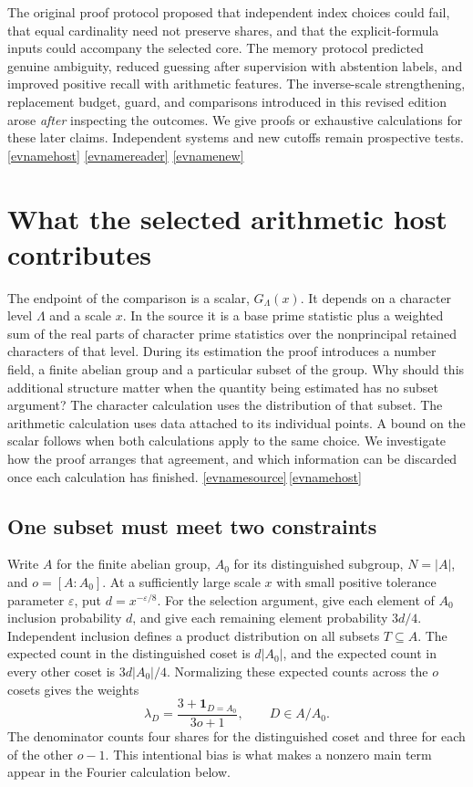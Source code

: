\documentclass[11pt,letterpaper]{article}
\newcommand{\evref}[1]{\hyperlink{ev-#1}{\textsf{\small[\csname evname#1\endcsname]}}}
\begin{document}
The original proof protocol proposed that independent index choices could fail, that equal cardinality need not preserve shares, and that the explicit-formula inputs could accompany the selected core. The memory protocol predicted genuine ambiguity, reduced guessing after supervision with abstention labels, and improved positive recall with arithmetic features. The inverse-scale strengthening, replacement budget, guard, and comparisons introduced in this revised edition arose \emph{after} inspecting the outcomes. We give proofs or exhaustive calculations for these later claims. Independent systems and new cutoffs remain prospective tests. \evref{host} \evref{reader} \evref{new}

\section{What the selected arithmetic host contributes}
\label{sec:retained-proof}

The endpoint of the comparison is a scalar, \(G_\Lambda(x)\). It depends on a character level \(\Lambda\) and a scale \(x\). In the source it is a base prime statistic plus a weighted sum of the real parts of character prime statistics over the nonprincipal retained characters of that level. During its estimation the proof introduces a number field, a finite abelian group and a particular subset of the group. Why should this additional structure matter when the quantity being estimated has no subset argument? The character calculation uses the distribution of that subset. The arithmetic calculation uses data attached to its individual points. A bound on the scalar follows when both calculations apply to the same choice. We investigate how the proof arranges that agreement, and which information can be discarded once each calculation has finished. \evref{source}\,\evref{host}

\subsection{One subset must meet two constraints}

Write \(A\) for the finite abelian group, \(A_0\) for its distinguished subgroup, \(N=|A|\), and \(o=[A:A_0]\). At a sufficiently large scale \(x\) with small positive tolerance parameter \(\varepsilon\), put \(d=x^{-\varepsilon/8}\). For the selection argument, give each element of \(A_0\) inclusion probability \(d\), and give each remaining element probability \(3d/4\). Independent inclusion defines a product distribution on all subsets \(T\subseteq A\). The expected count in the distinguished coset is \(d|A_0|\), and the expected count in every other coset is \(3d|A_0|/4\). Normalizing these expected counts across the \(o\) cosets gives the weights
\[
 \lambda_D=\frac{3+\mathbf{1}_{D=A_0}}{3o+1},
 \qquad D\in A/A_0.
\]
The denominator counts four shares for the distinguished coset and three for each of the other \(o-1\). This intentional bias is what makes a nonzero main term appear in the Fourier calculation below.
\end{document}
